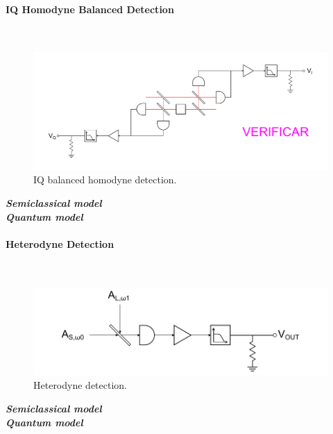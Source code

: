 \begin{bibunit}[plain]
\paragraph{IQ Homodyne Balanced Detection}\ \\
\begin{figure}[H]
	\centering
	\includegraphics[width=15cm]{./sdf/optical_detection/figures/detection-IQ-balanced-homodyne.pdf}
	\caption{IQ balanced homodyne detection.}
\end{figure}


{\bf \em Semiclassical model}\\
{\bf \em Quantum model}\\


\paragraph{Heterodyne Detection}\ \\
\begin{figure}[H]
	\centering
	\includegraphics{./sdf/optical_detection/figures/detection-heterodyne.pdf}
	\caption{Heterodyne detection.}
\end{figure}


{\bf \em Semiclassical model}\\
{\bf \em Quantum model}\\



\end{bibunit}
